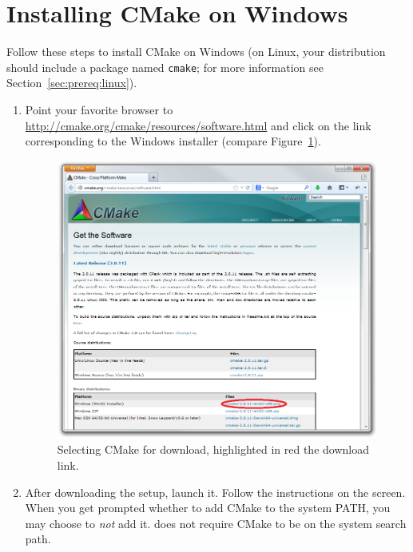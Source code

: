 %
% 
%
%
%

\section{Installing CMake on Windows}
\label{appx:install_cmake}

Follow these steps to install CMake on Windows
(on Linux, your distribution should include a package named \verb|cmake|; for more information see Section~\ref{sec:prereq:linux}).

\begin{enumerate}
	\item Point your favorite browser to \url{http://cmake.org/cmake/resources/software.html}
		and click on the link corresponding to the Windows installer
		(compare Figure~\ref{fig:setup_cmake_download}).

\begin{figure}[htbp]
	\centering
	\includegraphics[scale=0.5]{figures/setup_cmake_download_edited.png}
	\caption{Selecting CMake for download, highlighted in red the download link.}
	\label{fig:setup_cmake_download}
\end{figure}

	\item After downloading the setup, launch it. Follow the instructions on the screen.
		When you get prompted whether to add CMake to the system PATH, you may choose to \emph{not} add it.
		\xme does not require CMake to be on the system search path.

\end{enumerate}
